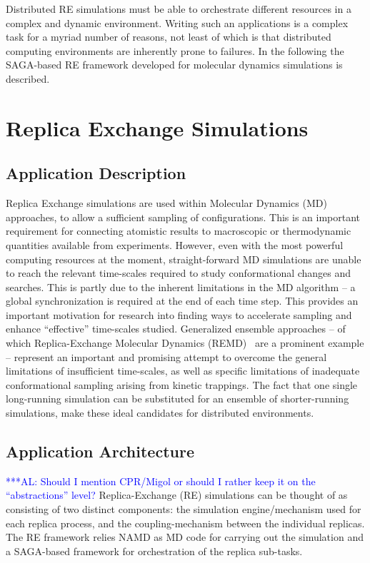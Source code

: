 \documentclass[conference,final]{IEEEtran}
\newcommand{\alnote}[1]{ {\textcolor{blue} { ***AL: #1 }}}
\newcommand{\alnote}[1]{}
\begin{document}
Distributed RE simulations must be able to orchestrate different
resources in a complex and dynamic environment.  Writing such an
applications is a complex task for a myriad number of reasons, not
least of which is that distributed computing environments are
inherently prone to failures. In the following the SAGA-based RE
framework developed for molecular dynamics simulations is described.

\section{Replica Exchange Simulations}
\subsection{Application Description}

Replica Exchange simulations are used within Molecular Dynamics (MD)
approaches, to allow a sufficient sampling of configurations. This is
an important requirement for connecting atomistic results to
macroscopic or thermodynamic quantities available from experiments.
However, even with the most powerful computing resources at the
moment, straight-forward MD simulations are unable to reach the
relevant time-scales required to study conformational changes and
searches. This is partly due to the inherent limitations in the MD
algorithm -- a global synchronization is required at the end of each
time step.  This provides an important motivation for research into
finding ways to accelerate sampling and enhance ``effective''
time-scales studied. Generalized ensemble approaches -- of which
Replica-Exchange Molecular Dynamics (REMD)~\cite{Sugita:1999rm} are a
prominent example -- represent an important and promising attempt to
overcome the general limitations of insufficient time-scales, as well
as specific limitations of inadequate conformational sampling arising
from kinetic trappings.  The fact that one single long-running
simulation can be substituted for an ensemble of shorter-running
simulations, make these ideal candidates for distributed environments.

\subsection{Application Architecture}
\alnote{Should I mention CPR/Migol or should I rather keep it on the 
``abstractions'' level?}
Replica-Exchange (RE) simulations can be thought of as consisting of
two distinct components: the  simulation engine/mechanism
used for each replica process, and the coupling-mechanism between the
individual replicas. The RE framework relies NAMD as MD code for 
carrying out the simulation and a SAGA-based framework 
for orchestration of the replica sub-tasks. 
\end{document}
